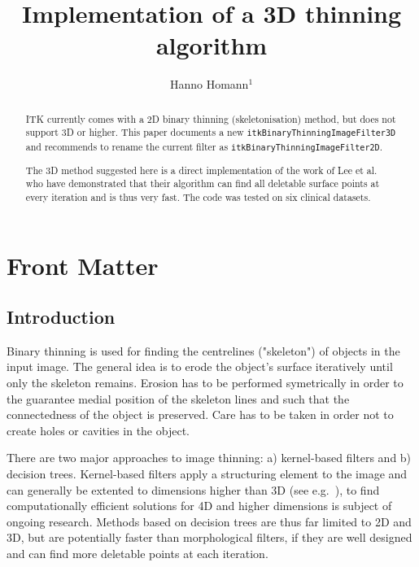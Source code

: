 \documentclass{InsightArticle}
\title{Implementation of a 3D thinning algorithm}
\author{Hanno Homann$^{1}$}
\begin{document}
\ifpdf
\else
\fi


\maketitle


\ifhtml
\chapter*{Front Matter\label{front}}
\fi


\begin{abstract}
\noindent

ITK currently comes with a 2D binary thinning (skeletonisation) method, but does not support 3D or higher. This paper documents a new \texttt{itkBinaryThinningImageFilter3D} and recommends to rename the current filter as \texttt{itkBinaryThinningImageFilter2D}.

The 3D method suggested here is a direct implementation of the work of Lee et al.~\cite{lee1994bsm} who have demonstrated that their algorithm can find all deletable surface points at every iteration and is thus very fast. The code was tested on six clinical datasets.
\end{abstract}

\tableofcontents


\section{Introduction}

Binary thinning is used for finding the centrelines ("skeleton") of objects in the input image. The general idea is to erode the object's surface iteratively until only the skeleton remains.
Erosion has to be performed symetrically in order to the guarantee medial position of the skeleton lines and such that the connectedness of the object is preserved. Care has to be taken in order not to create holes or cavities in the object.

There are two major approaches to image thinning: a) kernel-based filters and b) decision trees.
Kernel-based filters apply a structuring element to the image and can generally be extented to dimensions higher than 3D (see e.g.~\cite{jonker1953moa}), to find computationally efficient solutions for 4D and higher dimensions is subject of ongoing research.
Methods based on decision trees are thus far limited to 2D and 3D, but are potentially faster than morphological filters, if they are well designed and can find more deletable points at each iteration.
\end{document}
